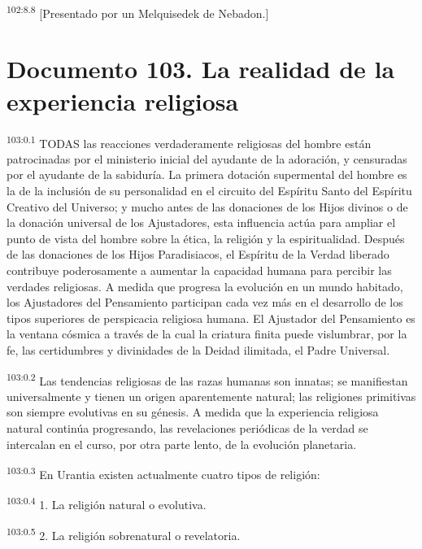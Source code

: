 \documentclass[twoside, 11pt]{book}
\begin{document}
\par
\textsuperscript{102:8.8} [Presentado por un Melquisedek de Nebadon.]


\chapter{Documento 103. La realidad de la experiencia religiosa}
\par
\textsuperscript{103:0.1} TODAS las reacciones verdaderamente religiosas del hombre están patrocinadas por el ministerio inicial del ayudante de la adoración, y censuradas por el ayudante de la sabiduría. La primera dotación supermental del hombre es la de la inclusión de su personalidad en el circuito del Espíritu Santo del Espíritu Creativo del Universo; y mucho antes de las donaciones de los Hijos divinos o de la donación universal de los Ajustadores, esta influencia actúa para ampliar el punto de vista del hombre sobre la ética, la religión y la espiritualidad. Después de las donaciones de los Hijos Paradisiacos, el Espíritu de la Verdad liberado contribuye poderosamente a aumentar la capacidad humana para percibir las verdades religiosas. A medida que progresa la evolución en un mundo habitado, los Ajustadores del Pensamiento participan cada vez más en el desarrollo de los tipos superiores de perspicacia religiosa humana. El Ajustador del Pensamiento es la ventana cósmica a través de la cual la criatura finita puede vislumbrar, por la fe, las certidumbres y divinidades de la Deidad ilimitada, el Padre Universal.

\par
\textsuperscript{103:0.2} Las tendencias religiosas de las razas humanas son innatas; se manifiestan universalmente y tienen un origen aparentemente natural; las religiones primitivas son siempre evolutivas en su génesis. A medida que la experiencia religiosa natural continúa progresando, las revelaciones periódicas de la verdad se intercalan en el curso, por otra parte lento, de la evolución planetaria.

\par
\textsuperscript{103:0.3} En Urantia existen actualmente cuatro tipos de religión:

\par
\textsuperscript{103:0.4} 1. La religión natural o evolutiva.

\par
\textsuperscript{103:0.5} 2. La religión sobrenatural o revelatoria.
\end{document}
